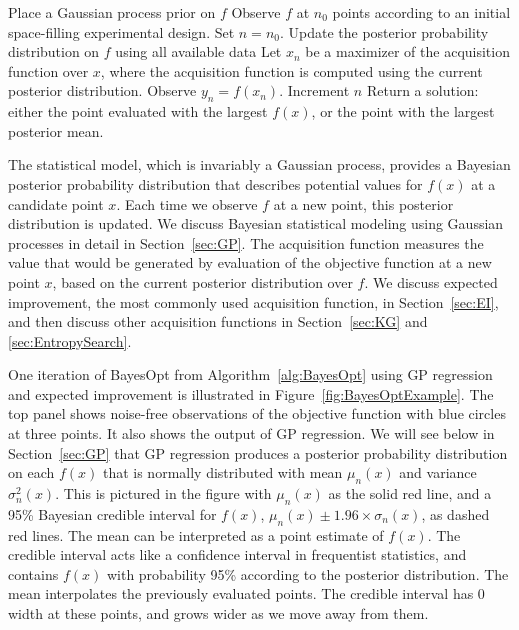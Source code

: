 \documentclass{article}
\begin{document}
\begin{algorithmic}
\begin{algorithm}
\STATE Place a Gaussian process prior on $f$
\STATE Observe $f$ at $n_0$ points according to an initial space-filling experimental design.  Set $n=n_0$.
\STATE Update the posterior probability distribution on $f$ using all available data
\STATE Let $x_n$ be a maximizer of the acquisition function over $x$, where the acquisition function is computed using the current posterior distribution.
\STATE Observe $y_n = f(x_n)$.
\STATE Increment $n$
\ENDWHILE
\STATE Return a solution: either the point evaluated with the largest $f(x)$, or the point with the largest posterior mean.
\caption{
Basic pseudo-code for Bayesian optimization
\label{alg:BayesOpt}
}
\end{algorithm}
\end{algorithmic}

The statistical model, which is invariably a Gaussian process, provides a Bayesian posterior probability distribution
 that describes potential values for $f(x)$ at a candidate point $x$.  Each time we observe $f$ at a new point, this posterior distribution is updated.  We discuss Bayesian statistical modeling using Gaussian processes in detail in Section~\ref{sec:GP}.
The acquisition function measures the value that would be generated by evaluation of the objective function at a new point $x$, based on the current posterior distribution over $f$.  
We discuss expected improvement, the most commonly used acquisition function, in Section~\ref{sec:EI}, and then discuss other acquisition functions in Section~\ref{sec:KG} and \ref{sec:EntropySearch}.

One iteration of BayesOpt from Algorithm~\ref{alg:BayesOpt} using GP regression and expected improvement is illustrated in Figure~\ref{fig:BayesOptExample}.
The top panel shows noise-free observations of the objective function with blue circles at three points.  It also shows the output of GP regression. 
We will see below in Section~\ref{sec:GP} that GP regression produces a posterior probability distribution on each $f(x)$ that is normally distributed with mean $\mu_n(x)$ and variance $\sigma^2_n(x)$.
This is pictured in the figure with $\mu_n(x)$ as the solid red line,  and a 95\% Bayesian credible interval for $f(x)$, $\mu_n(x) \pm 1.96\times\sigma_n(x)$, as dashed red lines.  
The mean can be interpreted as a point estimate of $f(x)$. The credible interval acts like a confidence interval in frequentist statistics, and contains $f(x)$ with probability 95\% according to the posterior distribution.  The mean interpolates the previously evaluated points. The credible interval has 0 width at these points, and grows wider as we move away from them.
\end{document}
